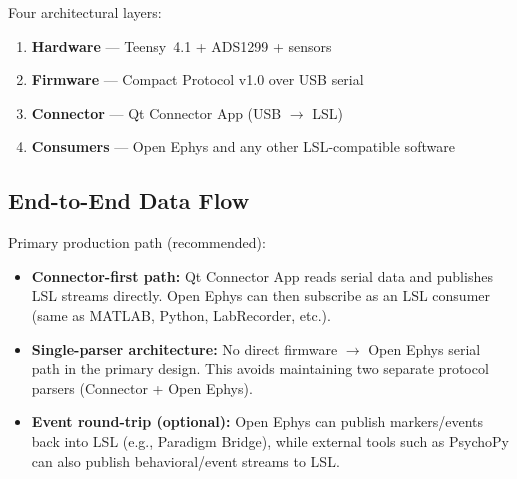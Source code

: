 \documentclass[11pt,a4paper]{article}
\begin{document}
Four architectural layers:

\begin{enumerate}[leftmargin=2cm]
    \item[\textcolor{hwcolor}{\textbf{L1}}] \textbf{Hardware} — Teensy~4.1 + ADS1299 + sensors
    \item[\textcolor{fwcolor}{\textbf{L2}}] \textbf{Firmware} — Compact Protocol v1.0 over USB serial
    \item[\textcolor{conncolor}{\textbf{L3}}] \textbf{Connector} — Qt Connector App (USB $\to$ LSL)
    \item[\textcolor{plugincolor}{\textbf{L4}}] \textbf{Consumers} — Open Ephys and any other LSL-compatible software
\end{enumerate}

\subsection{End-to-End Data Flow}

Primary production path (recommended):

\begin{itemize}
    \item \textbf{Connector-first path:} Qt Connector App reads serial data and
          publishes LSL streams directly. Open Ephys can then subscribe as an
          LSL consumer (same as MATLAB, Python, LabRecorder, etc.).
    \item \textbf{Single-parser architecture:} No direct firmware $\rightarrow$ Open Ephys
          serial path in the primary design. This avoids maintaining two separate
          protocol parsers (Connector + Open Ephys).
    \item \textbf{Event round-trip (optional):} Open Ephys can publish markers/events
          back into LSL (e.g., Paradigm Bridge), while external tools such as
          PsychoPy can also publish behavioral/event streams to LSL.
\end{itemize}
\end{document}

